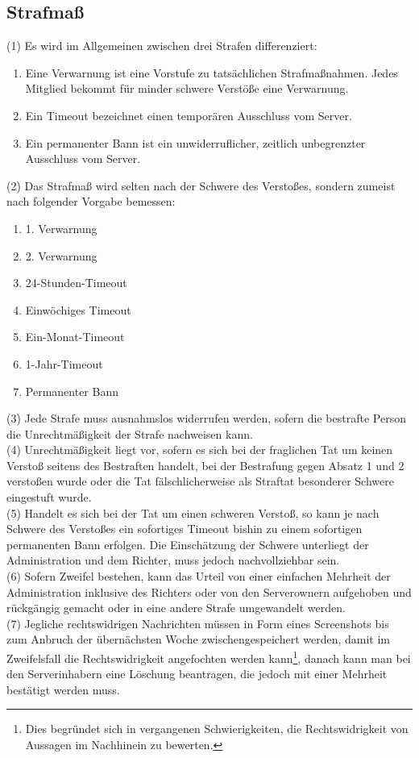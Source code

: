 \documentclass{article}
\begin{document}
\subsection{Strafmaß}
(1) Es wird im Allgemeinen zwischen drei Strafen differenziert:
\begin{enumerate}
	\item Eine Verwarnung ist eine Vorstufe zu tatsächlichen Strafmaßnahmen. Jedes Mitglied bekommt für minder schwere Verstöße eine Verwarnung.
	\item Ein Timeout bezeichnet einen temporären Ausschluss vom Server.
	\item Ein permanenter Bann ist ein unwiderruflicher, zeitlich unbegrenzter Ausschluss vom Server.
\end{enumerate}
(2) Das Strafmaß wird selten nach der Schwere des Verstoßes, sondern zumeist nach folgender Vorgabe bemessen:
\begin{enumerate}
	\item 1. Verwarnung
	\item 2. Verwarnung
	\item 24-Stunden-Timeout
	\item Einwöchiges Timeout
	\item Ein-Monat-Timeout
	\item 1-Jahr-Timeout
	\item Permanenter Bann
\end{enumerate}
(3) Jede Strafe muss ausnahmslos widerrufen werden, sofern die bestrafte Person die Unrechtmäßigkeit der Strafe nachweisen kann.\\
(4) Unrechtmäßigkeit liegt vor, sofern es sich bei der fraglichen Tat um keinen Verstoß seitens des Bestraften handelt, bei der Bestrafung gegen Absatz 1 und 2 verstoßen wurde oder die Tat fälschlicherweise als Straftat besonderer Schwere eingestuft wurde.\\
(5) Handelt es sich bei der Tat um einen schweren Verstoß, so kann je nach Schwere des Verstoßes ein sofortiges Timeout bishin zu einem sofortigen permanenten Bann erfolgen. Die Einschätzung der Schwere unterliegt der Administration und dem Richter, muss jedoch nachvollziehbar sein. \\
(6) Sofern Zweifel bestehen, kann das Urteil von einer einfachen Mehrheit der Administration inklusive des Richters oder von den Serverownern aufgehoben und rückgängig gemacht oder in eine andere Strafe umgewandelt werden.\\
(7) Jegliche rechtswidrigen Nachrichten müssen in Form eines Screenshots bis zum Anbruch der übernächsten Woche zwischengespeichert werden, damit im Zweifelsfall die Rechtswidrigkeit angefochten werden kann\footnote{Dies begründet sich in vergangenen Schwierigkeiten, die Rechtswidrigkeit von Aussagen im Nachhinein zu bewerten.}, danach kann man bei den Serverinhabern eine Löschung beantragen, die jedoch mit einer Mehrheit bestätigt werden muss.\\
\end{document}
